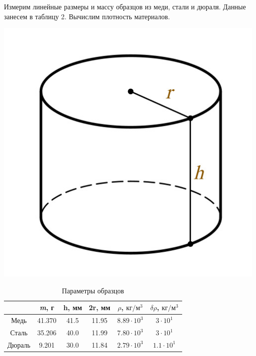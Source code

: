 \documentclass{article}
\begin{document}
\begin{table}[h!]
\centering
\begin{minipage}[h]{0.30\linewidth}
\centering
Измерим линейные размеры и массу образцов из меди, стали и дюраля. Данные занесем в таблицу 2. Вычислим плотность материалов.
\end{minipage}
\begin{minipage}[h]{0.2\linewidth}
\centeging
\includegraphics[width=1\textwidth]{cyl.jpg}
\end{minipage}
\begin{minipage}[h]{0.54\linewidth}
\centering

\begin{tabular}{|c|c|c|c|c|c|}
\hline
 & \textit{m}, г& h, мм& 2r, мм& $\rho$, $кг/м^3$& $\delta\rho$, $кг/м^3$\\
\hline
Медь & 41.370& 41.5& 11.95& $8.89 \cdot 10^3$& $ 3 \cdot 10^1$\\
\hline
Сталь & 35.206& 40.0& 11.99& $7.80 \cdot 10^3$& $ 3 \cdot 10^1$\\
\hline
Дюраль & 9.201& 30.0& 11.84& $2.79 \cdot 10^3$& $ 1.1 \cdot 10^1$\\
\hline
\end{tabular}
\label{table2}
\caption{Параметры образцов}
\end{minipage}
\end{table}
\end{document}
